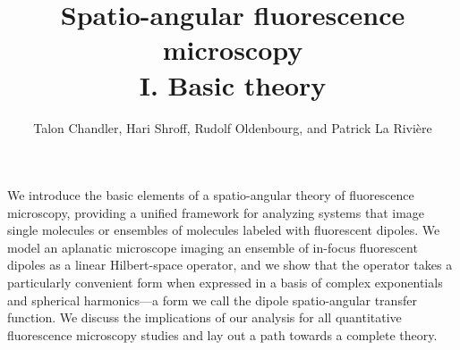 \documentclass[]{osa-article}
\begin{document}
\title{Spatio-angular fluorescence microscopy\\ I. Basic theory}

\author{Talon Chandler, Hari Shroff, Rudolf Oldenbourg, and Patrick La Rivi\`ere}

\address{University of Chicago, Department of Radiology, Chicago, Illinois 60637, USA\\
  Section on High Resolution Optical Imaging, National Institute
  of Biomedical Imaging and Bioengineering, National Institutes of Health,
  Bethesda, Maryland 20892, USA\\
  Marine Biological Laboratory, Bell Center, Woods Hole, Massachusetts 02543, USA
}




\begin{abstract*}
  We introduce the basic elements of a spatio-angular theory of fluorescence
  microscopy, providing a unified framework for analyzing systems that image
  single molecules or ensembles of molecules labeled with fluorescent dipoles.
  We model an aplanatic microscope imaging an ensemble of in-focus fluorescent
  dipoles as a linear Hilbert-space operator, and we show that the operator
  takes a particularly convenient form when expressed in a basis of complex
  exponentials and spherical harmonics---a form we call the dipole
  spatio-angular transfer function. We discuss the implications of our analysis
  for all quantitative fluorescence microscopy studies and lay out a path
  towards a complete theory. %
\end{abstract*}
\end{document}
